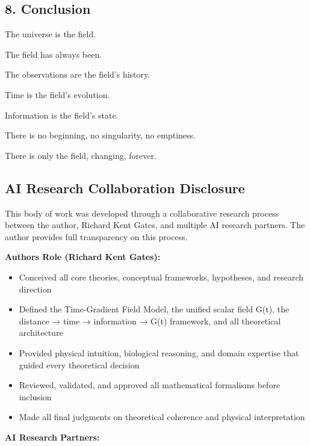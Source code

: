 \documentclass[
  10pt,
]{article}
\providecommand{\tightlist}{%
  \setlength{\itemsep}{0pt}\setlength{\parskip}{0pt}}
\begin{document}
\hypertarget{conclusion}{%
\subsection{8. Conclusion}\label{conclusion}}

The universe is the field.

The field has always been.

The observations are the field's history.

Time is the field's evolution.

Information is the field's state.

There is no beginning, no singularity, no emptiness.

There is only the field, changing, forever.

\hypertarget{ai-research-collaboration-disclosure}{%
\subsection{AI Research Collaboration
Disclosure}\label{ai-research-collaboration-disclosure}}

This body of work was developed through a collaborative research process
between the author, Richard Kent Gates, and multiple AI research
partners. The author provides full transparency on this process.

\textbf{Author\textquotesingle s Role (Richard Kent Gates):}

\begin{itemize}
\tightlist
\item
  Conceived all core theories, conceptual frameworks, hypotheses, and
  research direction
\item
  Defined the Time-Gradient Field Model, the unified scalar field G(t),
  the distance → time → information → G(t) framework, and all
  theoretical architecture
\item
  Provided physical intuition, biological reasoning, and domain
  expertise that guided every theoretical decision
\item
  Reviewed, validated, and approved all mathematical formalisms before
  inclusion
\item
  Made all final judgments on theoretical coherence and physical
  interpretation
\end{itemize}

\textbf{AI Research Partners:}
\end{document}
